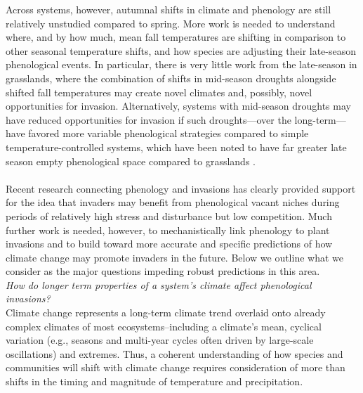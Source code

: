 \documentclass[11pt,a4paper,oneside]{article}
\begin{document}
Across systems, however, autumnal shifts in climate and phenology are still relatively unstudied compared to spring. More work is needed to understand where, and by how much, mean fall temperatures are shifting in comparison to other seasonal temperature shifts, and how species are adjusting their late-season phenological events. In particular, there is very little work from the late-season in grasslands, where the combination of shifts in mid-season droughts alongside shifted fall temperatures may create novel climates and, possibly, novel opportunities for invasion. Alternatively, systems with mid-season droughts may have reduced opportunities for invasion if such droughts---over the long-term---have favored more variable phenological strategies \citep[e.g., species flower very late to avoid stress of mid-season drought, see][]{Craine:2012eco} compared to simple temperature-controlled systems, which have been noted to have far greater late season empty phenological space compared to grasslands \citep{Craine:2012eco}. \\

\\
Recent research connecting phenology and invasions has clearly provided support for the idea that invaders may benefit from phenological vacant niches during periods of relatively high stress and disturbance but low competition. Much further work is needed, however, to mechanistically link phenology to plant invasions and to build toward more accurate and specific predictions of how climate change may promote invaders in the future. Below we outline what we consider as the major questions impeding robust predictions in this area.\\

\noindent \emph{How do longer term properties of a system's climate affect phenological invasions?} \\
\noindent  Climate change represents a long-term climate trend overlaid onto already complex climates of most ecosystems--including a climate's mean, cyclical variation (e.g., seasons and multi-year cycles often driven by large-scale oscillations) and extremes. Thus, a coherent understanding of how species and communities will shift with climate change requires consideration of more than shifts in the timing and magnitude of temperature and precipitation. 
\end{document}

